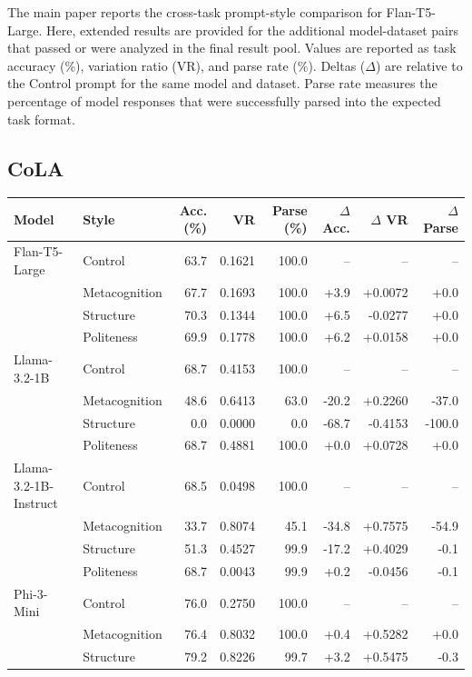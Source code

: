 \documentclass[11pt]{article}
\begin{document}
The main paper reports the cross-task prompt-style comparison for Flan-T5-Large. Here, extended results are provided for the additional model-dataset pairs that passed or were analyzed in the final result pool. Values are reported as task accuracy (\%), variation ratio (VR), and parse rate (\%). Deltas ($\Delta$) are relative to the Control prompt for the same model and dataset. Parse rate measures the percentage of model responses that were successfully parsed into the expected task format.

\subsection{CoLA}

\begin{table}[h]
\centering
\small
\setlength{\tabcolsep}{5pt}
\begin{tabular}{llrrrrrr}
\toprule
Model & Style & Acc. (\%) & VR & Parse (\%) & $\Delta$ Acc. & $\Delta$ VR & $\Delta$ Parse \\
\midrule
Flan-T5-Large & Control & 63.7 & 0.1621 & 100.0 & -- & -- & -- \\
 & Metacognition & 67.7 & 0.1693 & 100.0 & +3.9 & +0.0072 & +0.0 \\
 & Structure & 70.3 & 0.1344 & 100.0 & +6.5 & -0.0277 & +0.0 \\
 & Politeness & 69.9 & 0.1778 & 100.0 & +6.2 & +0.0158 & +0.0 \\
\midrule
Llama-3.2-1B & Control & 68.7 & 0.4153 & 100.0 & -- & -- & -- \\
 & Metacognition & 48.6 & 0.6413 & 63.0 & -20.2 & +0.2260 & -37.0 \\
 & Structure & 0.0 & 0.0000 & 0.0 & -68.7 & -0.4153 & -100.0 \\
 & Politeness & 68.7 & 0.4881 & 100.0 & +0.0 & +0.0728 & +0.0 \\
\midrule
Llama-3.2-1B-Instruct & Control & 68.5 & 0.0498 & 100.0 & -- & -- & -- \\
 & Metacognition & 33.7 & 0.8074 & 45.1 & -34.8 & +0.7575 & -54.9 \\
 & Structure & 51.3 & 0.4527 & 99.9 & -17.2 & +0.4029 & -0.1 \\
 & Politeness & 68.7 & 0.0043 & 99.9 & +0.2 & -0.0456 & -0.1 \\
\midrule
Phi-3-Mini & Control & 76.0 & 0.2750 & 100.0 & -- & -- & -- \\
 & Metacognition & 76.4 & 0.8032 & 100.0 & +0.4 & +0.5282 & +0.0 \\
 & Structure & 79.2 & 0.8226 & 99.7 & +3.2 & +0.5475 & -0.3 \\

\end{tabular}
\end{table}
\end{document}
